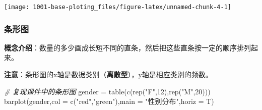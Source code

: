 \documentclass[
]{book}
\newenvironment{Shaded}{\begin{snugshade}}{\end{snugshade}}
\newcommand{\AttributeTok}[1]{\textcolor[rgb]{0.77,0.63,0.00}{#1}}
\newcommand{\CommentTok}[1]{\textcolor[rgb]{0.56,0.35,0.01}{\textit{#1}}}
\newcommand{\ConstantTok}[1]{\textcolor[rgb]{0.00,0.00,0.00}{#1}}
\newcommand{\DecValTok}[1]{\textcolor[rgb]{0.00,0.00,0.81}{#1}}
\newcommand{\FloatTok}[1]{\textcolor[rgb]{0.00,0.00,0.81}{#1}}
\newcommand{\FunctionTok}[1]{\textcolor[rgb]{0.00,0.00,0.00}{#1}}
\newcommand{\NormalTok}[1]{#1}
\newcommand{\OtherTok}[1]{\textcolor[rgb]{0.56,0.35,0.01}{#1}}
\newcommand{\SpecialCharTok}[1]{\textcolor[rgb]{0.00,0.00,0.00}{#1}}
\newcommand{\StringTok}[1]{\textcolor[rgb]{0.31,0.60,0.02}{#1}}
\begin{document}
\begin{Shaded}
\end{Shaded}

\begin{center}\texttt{[image: 1001-base-ploting\_files/figure-latex/unnamed-chunk-4-1]} \end{center}

\hypertarget{ux6761ux5f62ux56fe}{%
\subsubsection{条形图}\label{ux6761ux5f62ux56fe}}

\textbf{概念介绍}：数量的多少画成长短不同的直条，然后把这些直条按一定的顺序排列起来。

\textbf{注意}：条形图的x轴是数据类别（\textbf{离散型}），y轴是相应类别的频数。

\begin{Shaded}
\begin{Highlighting}[]
\CommentTok{\# 复现课件中的条形图}
\NormalTok{gender }\OtherTok{=} \FunctionTok{table}\NormalTok{(}\FunctionTok{c}\NormalTok{(}\FunctionTok{rep}\NormalTok{(}\StringTok{"F"}\NormalTok{,}\DecValTok{12}\NormalTok{),}\FunctionTok{rep}\NormalTok{(}\StringTok{"M"}\NormalTok{,}\DecValTok{20}\NormalTok{)))}
\FunctionTok{barplot}\NormalTok{(gender,}\AttributeTok{col =} \FunctionTok{c}\NormalTok{(}\StringTok{"red"}\NormalTok{,}\StringTok{"green"}\NormalTok{),}\AttributeTok{main =} \StringTok{"性别分布"}\NormalTok{,}\AttributeTok{horiz =}\NormalTok{ T)}
\end{Highlighting}
\end{Shaded}
\end{document}
